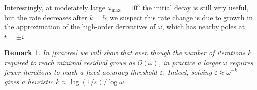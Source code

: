 \documentclass[10pt]{article}
\newcommand{\bigO}{{\mathcal O}}
\newtheorem{rmk}[thm]{Remark}
\newcommand{\om}{\omega}
\begin{document}
Interestingly, at moderately large $\om_{\text{max}}=10^3$ the initial decay is
still very useful, but the rate decreases after $k=5$; we
suspect this rate change is due to growth in the
approximation of the high-order derivatives of $\om$, which has nearby
poles at $t=\pm i$.
\begin{rmk}
In \cref{pracres} we will show that even though the number of iterations $k$
required to reach minimal residual grows as $\bigO(\om)$, in
practice a larger $\om$ requires \emph{fewer} iterations to reach a fixed
accuracy threshold $\varepsilon$.
Indeed, solving $\varepsilon\approx \om^{-k}$ gives a heuristic
$k\approx \log(1/\varepsilon)/\log \om$.
\end{rmk}
\end{document}
